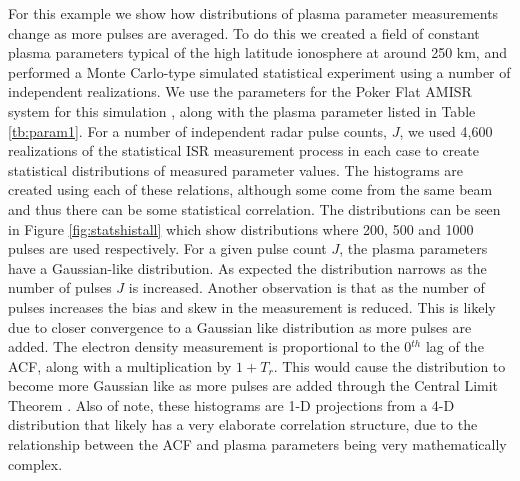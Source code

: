\documentclass[draft,ras]{agutex}
\newcommand{\pcom}[2]{\marginpar{{\footnotesize \bf #1}}{\it {#2}}}
\begin{document}
\begin{article}
For this example we show how distributions of plasma parameter measurements change as more pulses are averaged. To do this we created a field of constant plasma parameters typical of the high latitude ionosphere at around 250 km, and performed a Monte Carlo-type simulated statistical experiment using a number of independent realizations. We use the parameters for the Poker Flat AMISR system for this simulation \citep{Valentic:2013jg}, along with the plasma parameter listed in Table \ref{tb:param1}. For a number of independent radar pulse counts, $J$, we used 4,600 realizations of the statistical ISR measurement process in each case to create statistical distributions of measured parameter values. The histograms are created using each of these relations, although some come from the same beam and thus there can be some statistical correlation. The distributions can be seen in Figure \ref{fig:statshistall} which show distributions where 200, 500 and 1000 pulses are used respectively. For a given pulse count $J$, the plasma parameters have a Gaussian-like distribution. As expected the distribution narrows as the number of pulses $J$ is increased. Another observation is that as the number of pulses increases the bias and skew in the measurement is reduced. This is likely due to closer convergence to a Gaussian like distribution as more pulses are added. The electron density measurement is proportional to the 0$^{th}$ lag of the ACF, along with a multiplication by $1+T_r$. This would cause the distribution to become more Gaussian like as more pulses are added through the Central Limit Theorem \citep{papoulis2002}. Also of note, these histograms are 1-D projections from a 4-D distribution that likely has a very elaborate correlation structure, due to the relationship between the ACF and plasma parameters being very mathematically complex. 


\end{article}
\end{document}
